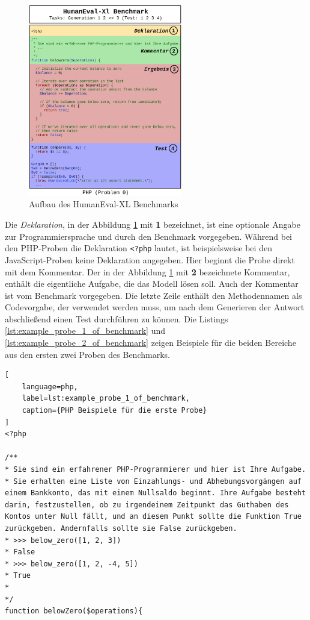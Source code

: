 \begin{figure}[!ht]
	\includegraphics[width=0.6\textwidth]{content/chapter_concept_design/images/code_generation_humaneval_x.eps}
	\centering
	\caption{Aufbau des HumanEval-XL Benchmarks}
	\label{img:code_generation_humaneval}
\end{figure}

Die \textit{Deklaration}, in der Abbildung \ref{img:code_generation_humaneval} mit \textbf{1} bezeichnet, ist eine optionale Angabe zur Programmiersprache und durch den Benchmark vorgegeben. Während bei den PHP-Proben die Deklaration \texttt{<?php} lautet, ist beispielsweise bei den JavaScript-Proben keine Deklaration angegeben. Hier beginnt die Probe direkt mit dem Kommentar. Der in der Abbildung \ref{img:code_generation_humaneval} mit \textbf{2} bezeichnete Kommentar, enthält die eigentliche Aufgabe, die das Modell lösen soll. Auch der Kommentar ist vom Benchmark vorgegeben. Die letzte Zeile enthält den Methodennamen als Codevorgabe, der verwendet werden muss, um nach dem Generieren der Antwort abschließend einen Test durchführen zu können. Die Listings \ref{lst:example_probe_1_of_benchmark} und \ref{lst:example_probe_2_of_benchmark} zeigen Beispiele für die beiden Bereiche aus den ersten zwei Proben des Benchmarks.\vspace{0.2cm}

\begin{lstlisting}[
	language=php,
	label=lst:example_probe_1_of_benchmark,
	caption={PHP Beispiele für die erste Probe}
]
<?php

/**
* Sie sind ein erfahrener PHP-Programmierer und hier ist Ihre Aufgabe.
* Sie erhalten eine Liste von Einzahlungs- und Abhebungsvorgängen auf einem Bankkonto, das mit einem Nullsaldo beginnt. Ihre Aufgabe besteht darin, festzustellen, ob zu irgendeinem Zeitpunkt das Guthaben des Kontos unter Null fällt, und an diesem Punkt sollte die Funktion True zurückgeben. Andernfalls sollte sie False zurückgeben.
* >>> below_zero([1, 2, 3])
* False
* >>> below_zero([1, 2, -4, 5])
* True
*
*/
function belowZero($operations){
\end{lstlisting}


